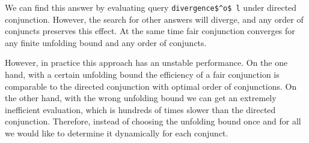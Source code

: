We can find this answer by evaluating query \lstinline{divergence$^o$ l} under directed conjunction. However, the search for other answers will diverge, and any order of conjuncts preserves this effect. At the same time fair conjunction converges for any finite unfolding bound and any order of conjuncts.

However, in practice this approach has an unstable performance. On the one hand, with a certain unfolding bound the efficiency of a fair conjunction is comparable to the directed conjunction
with optimal order of conjunctions. On the other hand, with the wrong unfolding bound we can get an extremely inefficient evaluation, which is hundreds of times slower than the directed
conjunction. Therefore, instead of choosing the unfolding bound once and for all we would like to determine it dynamically for each conjunct.

